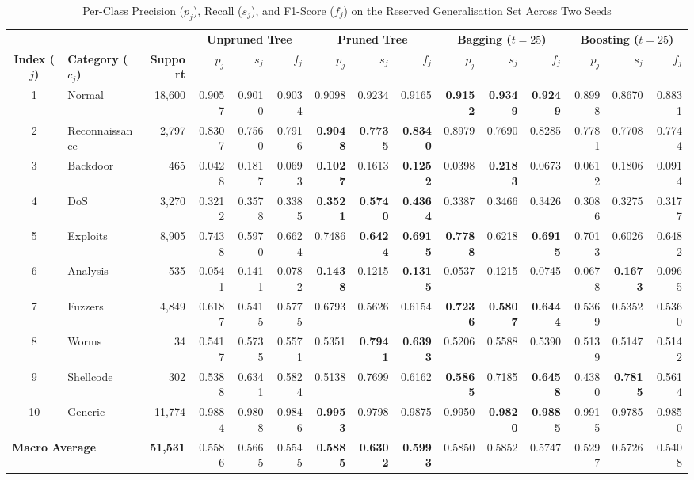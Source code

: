 \begin{table}[!t]
\centering
\caption{Per-Class Precision ($p_j$), Recall ($s_j$), and F1-Score ($f_j$) on the Reserved Generalisation Set Across Two Seeds}
\label{tab:generalization_per_class}
\footnotesize
\setlength{\tabcolsep}{4.3pt}
\begin{tabular}{clrrrrrrrrrrrrr}
\toprule
 & & & \multicolumn{3}{c}{\textbf{Unpruned Tree}} & \multicolumn{3}{c}{\textbf{Pruned Tree}} & \multicolumn{3}{c}{\textbf{Bagging ($t=25$)}} & \multicolumn{3}{c}{\textbf{Boosting ($t=25$)}} \\
\cmidrule(lr){4-6} \cmidrule(lr){7-9} \cmidrule(lr){10-12} \cmidrule(lr){13-15}
\textbf{Index ($j$)} & \textbf{Category ($c_j$)} & \textbf{Support} & $p_j$ & $s_j$ & $f_j$ & $p_j$ & $s_j$ & $f_j$ & $p_j$ & $s_j$ & $f_j$ & $p_j$ & $s_j$ & $f_j$ \\
\midrule
1  & Normal         & 18,600 & 0.9057 & 0.9010 & 0.9034 & 0.9098 & 0.9234 & 0.9165 & \textbf{0.9152} & \textbf{0.9349} & \textbf{0.9249} & 0.8998 & 0.8670 & 0.8831 \\
2  & Reconnaissance &  2,797 & 0.8307 & 0.7560 & 0.7916 & \textbf{0.9048} & \textbf{0.7735} & \textbf{0.8340} & 0.8979 & 0.7690 & 0.8285 & 0.7781 & 0.7708 & 0.7744 \\
3  & Backdoor       &    465 & 0.0428 & 0.1817 & 0.0693 & \textbf{0.1027} & 0.1613 & \textbf{0.1252} & 0.0398 & \textbf{0.2183} & 0.0673 & 0.0612 & 0.1806 & 0.0914 \\
4  & DoS            &  3,270 & 0.3212 & 0.3578 & 0.3385 & \textbf{0.3521} & \textbf{0.5740} & \textbf{0.4364} & 0.3387 & 0.3466 & 0.3426 & 0.3086 & 0.3275 & 0.3177 \\
5  & Exploits       &  8,905 & 0.7438 & 0.5970 & 0.6624 & 0.7486 & \textbf{0.6424} & \textbf{0.6915} & \textbf{0.7788} & 0.6218 & \textbf{0.6915} & 0.7013 & 0.6026 & 0.6482 \\
6  & Analysis       &    535 & 0.0541 & 0.1411 & 0.0782 & \textbf{0.1438} & 0.1215 & \textbf{0.1315} & 0.0537 & 0.1215 & 0.0745 & 0.0678 & \textbf{0.1673} & 0.0965 \\
7  & Fuzzers        &  4,849 & 0.6187 & 0.5415 & 0.5775 & 0.6793 & 0.5626 & 0.6154 & \textbf{0.7236} & \textbf{0.5807} & \textbf{0.6444} & 0.5369 & 0.5352 & 0.5360 \\
8  & Worms          &     34 & 0.5417 & 0.5735 & 0.5571 & 0.5351 & \textbf{0.7941} & \textbf{0.6393} & 0.5206 & 0.5588 & 0.5390 & 0.5139 & 0.5147 & 0.5142 \\
9  & Shellcode      &    302 & 0.5388 & 0.6341 & 0.5824 & 0.5138 & 0.7699 & 0.6162 & \textbf{0.5865} & 0.7185 & \textbf{0.6458} & 0.4380 & \textbf{0.7815} & 0.5614 \\
10 & Generic        & 11,774 & 0.9884 & 0.9808 & 0.9846 & \textbf{0.9953} & 0.9798 & 0.9875 & 0.9950 & \textbf{0.9820} & \textbf{0.9885} & 0.9915 & 0.9785 & 0.9850 \\
\midrule
\multicolumn{2}{l}{\textbf{Macro Average}} & \textbf{51,531} & 0.5586 & 0.5665 & 0.5545 & \textbf{0.5885} & \textbf{0.6302} & \textbf{0.5993} & 0.5850 & 0.5852 & 0.5747 & 0.5297 & 0.5726 & 0.5408 \\
\bottomrule
\end{tabular}
\end{table}

